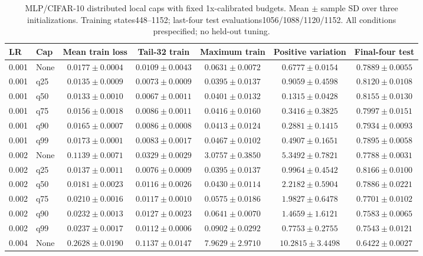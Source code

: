 \begin{table}[t]
\centering
\caption{MLP/CIFAR-10 distributed local caps with fixed 1x-calibrated budgets. Mean $\pm$ sample SD over three initializations. Training states448--1152; last-four test evaluations1056/1088/1120/1152. All conditions prespecified; no held-out tuning.}
\label{tab:mlp-cap-lr}
\scriptsize
\begin{tabular}{llccccc}
\toprule
LR & Cap & Mean train loss & Tail-32 train & Maximum train & Positive variation & Final-four test \\
\midrule
0.001 & None & $0.0177 \pm 0.0004$ & $0.0109 \pm 0.0043$ & $0.0631 \pm 0.0072$ & $0.6777 \pm 0.0154$ & $0.7889 \pm 0.0055$ \\
0.001 & q25 & $0.0135 \pm 0.0009$ & $0.0073 \pm 0.0009$ & $0.0395 \pm 0.0137$ & $0.9059 \pm 0.4598$ & $0.8120 \pm 0.0108$ \\
0.001 & q50 & $0.0133 \pm 0.0010$ & $0.0067 \pm 0.0011$ & $0.0401 \pm 0.0132$ & $0.1315 \pm 0.0428$ & $0.8155 \pm 0.0130$ \\
0.001 & q75 & $0.0156 \pm 0.0018$ & $0.0086 \pm 0.0011$ & $0.0416 \pm 0.0160$ & $0.3416 \pm 0.3825$ & $0.7997 \pm 0.0151$ \\
0.001 & q90 & $0.0165 \pm 0.0007$ & $0.0086 \pm 0.0008$ & $0.0413 \pm 0.0124$ & $0.2881 \pm 0.1415$ & $0.7934 \pm 0.0093$ \\
0.001 & q99 & $0.0173 \pm 0.0001$ & $0.0083 \pm 0.0017$ & $0.0467 \pm 0.0102$ & $0.4907 \pm 0.1651$ & $0.7895 \pm 0.0058$ \\
\midrule
0.002 & None & $0.1139 \pm 0.0071$ & $0.0329 \pm 0.0029$ & $3.0757 \pm 0.3850$ & $5.3492 \pm 0.7821$ & $0.7788 \pm 0.0031$ \\
0.002 & q25 & $0.0137 \pm 0.0011$ & $0.0076 \pm 0.0009$ & $0.0395 \pm 0.0137$ & $0.9964 \pm 0.4542$ & $0.8166 \pm 0.0100$ \\
0.002 & q50 & $0.0181 \pm 0.0023$ & $0.0116 \pm 0.0026$ & $0.0430 \pm 0.0114$ & $2.2182 \pm 0.5904$ & $0.7886 \pm 0.0221$ \\
0.002 & q75 & $0.0210 \pm 0.0016$ & $0.0117 \pm 0.0010$ & $0.0575 \pm 0.0186$ & $1.9827 \pm 0.6478$ & $0.7701 \pm 0.0102$ \\
0.002 & q90 & $0.0232 \pm 0.0013$ & $0.0127 \pm 0.0023$ & $0.0641 \pm 0.0070$ & $1.4659 \pm 1.6121$ & $0.7583 \pm 0.0065$ \\
0.002 & q99 & $0.0237 \pm 0.0017$ & $0.0112 \pm 0.0006$ & $0.0902 \pm 0.0292$ & $0.7753 \pm 0.2755$ & $0.7543 \pm 0.0121$ \\
\midrule
0.004 & None & $0.2628 \pm 0.0190$ & $0.1137 \pm 0.0147$ & $7.9629 \pm 2.9710$ & $10.2815 \pm 3.4498$ & $0.6422 \pm 0.0027$ \\

\end{tabular}
\end{table}
